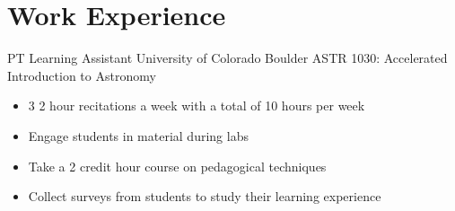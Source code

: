 \documentclass[11pt]{article} %
\begin{document}


    
    
    
    
    
    
    
    
    
    


\pagebreak[3]
\section{Work Experience}




    {PT}
    {Learning Assistant}
    {University of Colorado Boulder}
    {ASTR 1030: Accelerated Introduction to Astronomy}
    {\begin{itemize}
    \setlength\itemsep{0.1em}
        \item 3 2 hour recitations a week with a total of 10 hours per week
        \item Engage students in material during labs
        \item Take a 2 credit hour course on pedagogical techniques
        \item Collect surveys from students to study their learning experience
    \end{itemize}}
\end{document}
